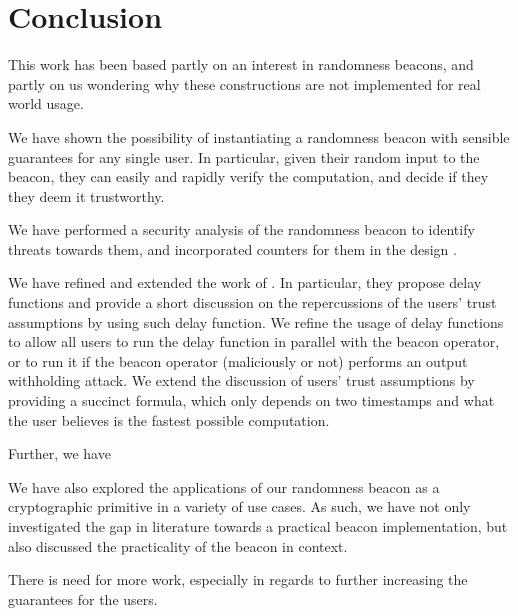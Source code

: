\section{Conclusion}%
\label{sec:conclusion}

This work has been based partly on an interest in randomness beacons, and partly on us wondering why these constructions are not implemented for real world usage.

We have shown the possibility of instantiating a randomness beacon with sensible guarantees for any single user. In particular, given their random input to the beacon, they can easily and rapidly verify the computation, and decide if they they deem it trustworthy.

We have performed a security analysis of the randomness beacon to identify threats towards them, and incorporated counters for them in the design .

We have refined and extended the work of \citet{randomzoo}.
In particular, they propose delay functions and provide a short discussion on the repercussions of the users' trust assumptions by using such delay function.
We refine the usage of delay functions to allow all users to run the delay function in parallel with the beacon operator, or to run it if the beacon operator (maliciously or not) performs an output withholding attack.
We extend the discussion of users' trust assumptions by providing a succinct formula, which only depends on two timestamps and what the user believes is the fastest possible computation.

Further, we have 

We have also explored the applications of our randomness beacon as a cryptographic primitive in a variety of use cases. As such, we have not only investigated the gap in literature towards a practical beacon implementation, but also discussed the practicality of the beacon in context.



There is need for more work, especially in regards to further increasing the guarantees for the users.


